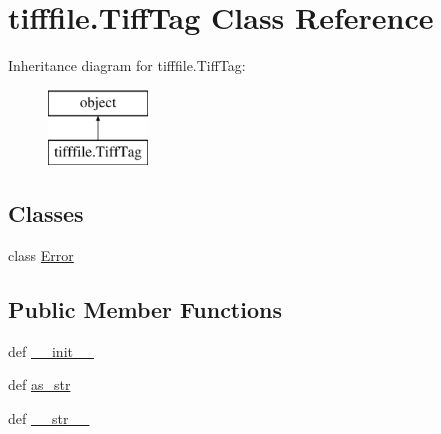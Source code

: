 \hypertarget{classtifffile_1_1TiffTag}{\section{tifffile.\-Tiff\-Tag Class Reference}
\label{classtifffile_1_1TiffTag}
}
Inheritance diagram for tifffile.\-Tiff\-Tag\-:\begin{figure}[H]
\begin{center}
\leavevmode
\includegraphics[height=2.000000cm]{classtifffile_1_1TiffTag}
\end{center}
\end{figure}
\subsection*{Classes}
\begin{DoxyCompactItemize}
\item 
class \hyperlink{classtifffile_1_1TiffTag_1_1Error}{Error}
\end{DoxyCompactItemize}
\subsection*{Public Member Functions}
\begin{DoxyCompactItemize}
\item 
def \hyperlink{classtifffile_1_1TiffTag_ace152e86d4dec367306b2aa8c966870a}{\-\_\-\-\_\-init\-\_\-\-\_\-}
\item 
def \hyperlink{classtifffile_1_1TiffTag_a6ee3a148b9b7d1233b30a011c0bbcecf}{as\-\_\-str}
\item 
def \hyperlink{classtifffile_1_1TiffTag_a3566254292688e9a17f1d71e1506c025}{\-\_\-\-\_\-str\-\_\-\-\_\-}
\end{DoxyCompactItemize}
